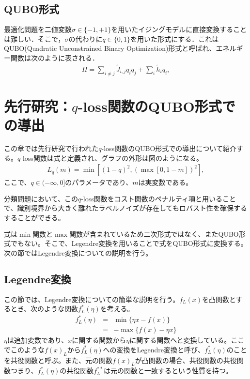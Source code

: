 \documentclass[paper]{ieicej}
\begin{document}
\subsection{QUBO形式}
最適化問題を二値変数$\sigma\in\{-1,+1\}$を用いたイジングモデルに直接変換することは難しい．そこで，$\sigma$の代わりに$q\in\{0,1\}$を用いた形式にする．これはQUBO(Quadratic Unconstrained Binary Optimization)形式と呼ばれ、エネルギー関数は次のように表される．
\begin{eqnarray}
 H = \sum_{i\neq j}{\widetilde{J}_{i,j}q_{i}q_{j}}+\sum_{i}{\widetilde{h}_{i}q_{i}}, \label{QUBO_model}
\end{eqnarray}

\section{先行研究：$q$-loss関数のQUBO形式での導出}
この章では先行研究で行われた$q$-loss関数のQUBO形式での導出について紹介する。$q$-loss関数は式と定義され、グラフの外形は図のようになる。
\begin{eqnarray}
 L_{q}(m) = \min{[(1-q)^{2},(\max{[0,1-m]})^{2}]},
\end{eqnarray}
ここで、$q\in(-\infty,0]$のパラメータであり、$m$は実変数である。

分類問題において、この$q$-loss関数をコスト関数のペナルティ項と用いることで、識別境界から大きく離れたラベルノイズが存在してもロバスト性を確保するすることができる。

式は$\min$関数と$\max$関数が含まれているため二次形式ではなく、またQUBO形式でもない。そこで、Legendre変換を用いることで式をQUBO形式に変換する。次の節ではLegendre変換についての説明を行う。

\subsection{Legendre変換}
この節では、Legendre変換についての簡単な説明を行う。$f_{L}(x)$を凸関数とするとき、次のような関数$f^{*}_{L}(\eta)$を考える。
\begin{eqnarray}
 f^{*}_{L}(\eta) &=& \min{\{\eta x-f(x)\}} \\
                 &=& -\max{\{f(x)-\eta x\}}
\end{eqnarray}
$\eta$は追加変数であり、$x$に関する関数から$\eta$に関する関数へと変換している。ここでこのような$f(x)_{L}$から$f^{*}_{L}(\eta)$への変換をLegendre変換と呼び、$f^{*}_{L}(\eta)$のことを共役関数と呼ぶ。また、元の関数$f(x)_{L}$が凸関数の場合、共役関数の共役関数つまり、$f^{*}_{L}(\eta)$の共役関数$f^{**}_{L}$は元の関数と一致するという性質を持つ。
\end{document}
